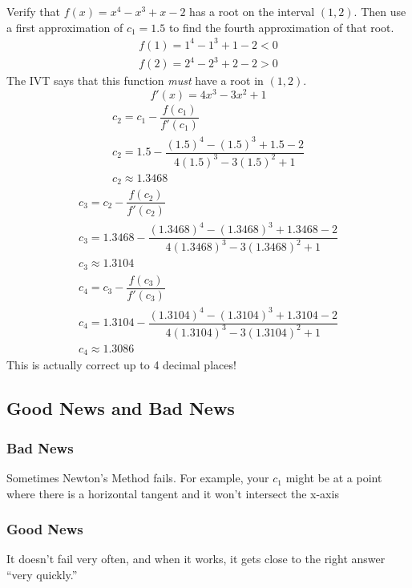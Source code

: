 \begin{example}
    Verify that $f(x) = x^4 - x^3 + x - 2$ has a root on the interval $(1, 2)$. Then use a first approximation of $c_1 = 1.5$ to find the fourth approximation of that root.
    \begin{gather*}
        f(1) = 1^4 - 1^3 + 1 - 2 < 0 \\
        f(2) = 2^4 - 2^3 + 2 - 2 > 0
    \end{gather*}
    The IVT says that this function \textit{must} have a root in $(1, 2)$.
    \begin{equation*}
        f'(x) = 4x^3 - 3x^2 + 1
    \end{equation*}
    \begin{gather*}
        c_2 = c_1 - \dfrac{f(c_1)}{f'(c_1)} \\
        c_2 = 1.5 - \dfrac{(1.5)^4 - (1.5)^3 + 1.5 - 2}{4(1.5)^3 - 3(1.5)^2 + 1} \\
        c_2 \approx 1.3468
    \end{gather*}
    \begin{gather*}
        c_3 = c_2 - \dfrac{f(c_2)}{f'(c_2)} \\
        c_3 = 1.3468 - \dfrac{(1.3468)^4 - (1.3468)^3 + 1.3468 - 2}{4(1.3468)^3 - 3(1.3468)^2 + 1} \\
        c_3 \approx 1.3104
    \end{gather*}
    \begin{gather*}
        c_4 = c_3 - \dfrac{f(c_3)}{f'(c_3)} \\
        c_4 = 1.3104 - \dfrac{(1.3104)^4 - (1.3104)^3 + 1.3104 - 2}{4(1.3104)^3 - 3(1.3104)^2 + 1} \\
        c_4  \approx 1.3086
    \end{gather*}
    This is actually correct up to 4 decimal places!
\end{example}
\subsection{Good News and Bad News}
\subsubsection{Bad News}
Sometimes Newton's Method fails. For example, your $c_1$ might be at a point where there is a horizontal tangent and it won't intersect the x-axis
\subsubsection{Good News}
It doesn't fail very often, and when it works, it gets close to the right answer ``very quickly.''
